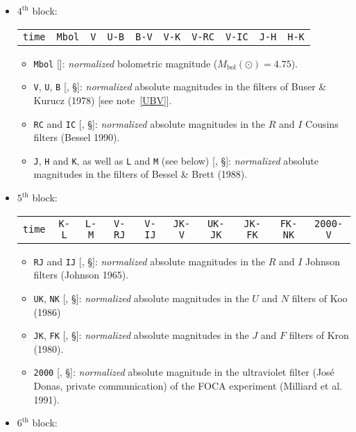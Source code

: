 \documentclass[11pt,draft,fleqn]{article}
\begin{document}
\begin{itemize}
\begin{itemize}
\end{itemize}
\item $4^{\mathrm{th}}$ block:
\begin{tabular}{@{}cccccccccc}
\texttt{time} &   \texttt{Mbol} &      \texttt{V} &      \texttt{U-B} &     \texttt{B-V} &     \texttt{V-K} &     \texttt{V-RC} &    \texttt{V-IC} &    \texttt{J-H} &     \texttt{H-K}
\end{tabular}
\begin{itemize}
\item \texttt{Mbol} [\ddag]: \emph{normalized} bolometric magnitude ($M_{\mathrm{bol}}(\odot)=4.75$).
\item \texttt{V}, \texttt{U}, \texttt{B} [\ddag, \S]:
\emph{normalized} absolute
magnitudes in the filters of Buser \& Kurucz (1978) [see note~\ref{UBV}].
\item \texttt{RC} and \texttt{IC} [\ddag, \S]: \emph{normalized} absolute
magnitudes in the $R$ and $I$ Cousins
filters (Bessel 1990).
\item \texttt{J}, \texttt{H} and \texttt{K}, 
as well as \texttt{L} and
\texttt{M} (see below) [\ddag, \S]: \emph{normalized} absolute
magnitudes in the filters
of Bessel \& Brett (1988).
\end{itemize}
\item $5^{\mathrm{th}}$ block:
\begin{tabular}{@{}cccccccccc}
\texttt{time} &    \texttt{K-L} &    \texttt{L-M} &     \texttt{V-RJ} &    \texttt{V-IJ} &    \texttt{JK-V} &   \texttt{UK-JK} &   \texttt{JK-FK} &   \texttt{FK-NK} &  \texttt{2000-V}
\end{tabular}
\begin{itemize}
\item \texttt{RJ} and \texttt{IJ} [\ddag, \S]: \emph{normalized} absolute
magnitudes in the $R$ and $I$ Johnson
filters (Johnson 1965).
\item \texttt{UK}, \texttt{NK} [\ddag, \S]: \emph{normalized} absolute
magnitudes in the $U$ and $N$ filters of Koo (1986)
\item \texttt{JK}, \texttt{FK} [\ddag, \S]: \emph{normalized} absolute
magnitudes in the $J$ and $F$ filters of Kron (1980).
\item \texttt{2000} [\ddag, \S]: \emph{normalized} absolute
magnitude in the ultraviolet filter (Jos\'e Donas, private
communication) 
of the FOCA
experiment (Milliard et al. 1991).
\end{itemize}
\item $6^{\mathrm{th}}$ block:
\begin{tabular}{@{}cccccccccc}

\end{tabular}
\end{itemize}
\end{document}
